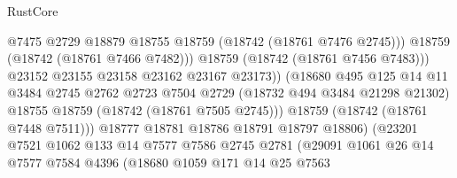 \begin{lexlean}{RustCore}
\begin{coremodule}
                                          @7475
                                          @2729
                                          @18879
                                          @18755
                                          @18759
                                          (@18742 (@18761 @7476 @2745)))
                                        @18759
                                        (@18742 (@18761 @7466 @7482)))
                                      @18759
                                      (@18742 (@18761 @7456 @7483)))
                                    @23152
                                    @23155
                                    @23158
                                    @23162
                                    @23167
                                    @23173))
                                (@18680
                                  @495
                                  @125
                                  @14
                                  @11
                                  @3484
                                  @2745
                                  @2762
                                  @2723
                                  @7504
                                  @2729
                                  (@18732 @494 @3484 @21298 @21302)
                                  @18755
                                  @18759
                                  (@18742 (@18761 @7505 @2745)))
                                @18759
                                (@18742 (@18761 @7448 @7511)))
                              @18777
                              @18781
                              @18786
                              @18791
                              @18797
                              @18806)
                            (@23201
                              @7521
                              @1062
                              @133
                              @14
                              @7577
                              @7586
                              @2745
                              @2781
                              (@29091
                                @1061
                                @26
                                @14
                                @7577
                                @7584
                                @4396
                                (@18680
                                  @1059
                                  @171
                                  @14
                                  @25
                                  @7563

\end{coremodule}
\end{lexlean}
